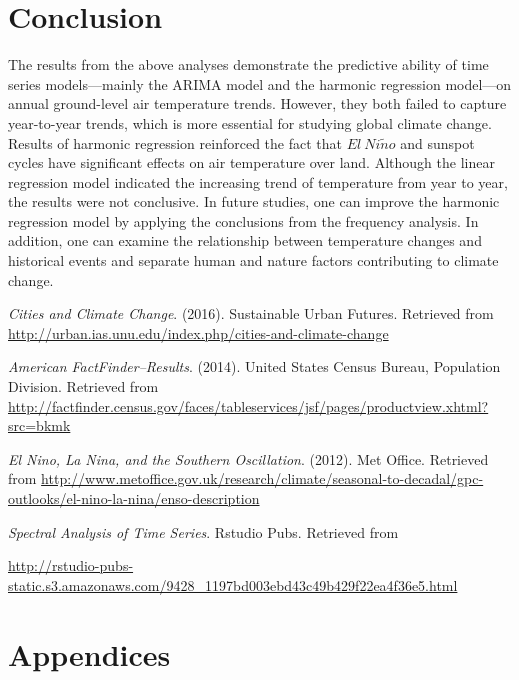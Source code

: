 \documentclass[12pt]{article}
\begin{document}
\section{Conclusion}
The results from the above analyses demonstrate the predictive ability of time series models---mainly the ARIMA model and the harmonic regression model---on annual ground-level air temperature trends. However, they both failed to capture year-to-year trends, which is more essential for studying global climate change. Results of harmonic regression reinforced the fact that $El\ Ni\tilde{n}o$ and sunspot cycles have significant effects on air temperature over land. Although the linear regression model indicated the increasing trend of temperature from year to year, the results were not conclusive. In future studies, one can improve the harmonic regression model by applying the conclusions from the frequency analysis. In addition, one can examine the relationship between temperature changes and historical events and separate human and nature factors contributing to climate change.




\newpage


\begin{thebibliography}{9}

\textit{Cities and Climate Change}. (2016). Sustainable Urban Futures. Retrieved from \url{http://urban.ias.unu.edu/index.php/cities-and-climate-change}

\textit{American FactFinder--Results}. (2014). United States Census Bureau, Population Division. Retrieved from \url{http://factfinder.census.gov/faces/tableservices/jsf/pages/productview.xhtml?src=bkmk}

\textit{El Nino, La Nina, and the Southern Oscillation}. (2012). Met Office. Retrieved from \url{http://www.metoffice.gov.uk/research/climate/seasonal-to-decadal/gpc-outlooks/el-nino-la-nina/enso-description}

\textit{Spectral Analysis of Time Series}. Rstudio Pubs. Retrieved from 

\url{http://rstudio-pubs-static.s3.amazonaws.com/9428_1197bd003ebd43c49b429f22ea4f36e5.html}

\end{thebibliography}




\newpage
\section*{Appendices}
\end{document}
